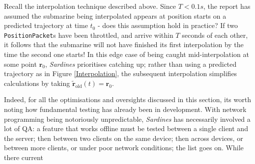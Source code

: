 \documentclass[a4paper, 10pt]{article}
\begin{document}
\begin{flushleft}
\vspace{5pt}\noindent
Recall the interpolation technique described above. Since $T < 0.1s$, the report has assumed the submarine being interpolated appears at position starts on a predicted trajectory at time $t_0$ - does this assumption hold in practice? If two \texttt{PositionPacket}s have been throttled, and arrive within $T$ seconds of each other, it follows that the submarine will not have finished its first interpolation by the time the second one starts! In this edge case of being caught mid-interpolation at some point $\mathbf{r}_0$, \textit{Sardines} prioritises catching up; rather than using a predicted trajectory as in Figure \ref{Interpolation}, the subsequent interpolation simplifies calculations by taking $\mathbf{\tilde{r}}_{\textrm{old}}(t) = \mathbf{r}_0$.

\vspace{5pt}\noindent
Indeed, for all the optimisations and oversights discussed in this section, its worth noting how fundamental testing has already been in development. With network programming being notoriously unpredictable, \textit{Sardines} has necessarily involved a lot of QA: a feature that works offline must be tested between a single client and the server; then between two clients on the same device; then across devices, or between more clients, or under poor network conditions; the list goes on. While there current 



\end{flushleft}
\end{document}
